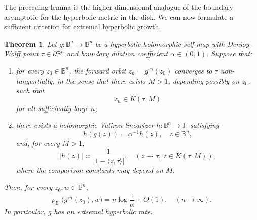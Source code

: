 \documentclass[12pt]{amsart}
\numberwithin{equation}{section}
\theoremstyle{plain}
\newtheorem{theorem}[equation]{Theorem}
\theoremstyle{definition}
\begin{document}
The preceding lemma is the higher-dimensional analogue of the boundary
asymptotic for the hyperbolic metric in the disk. We can now formulate a
sufficient criterion for extremal hyperbolic growth.

\begin{theorem}
\label{thm:ball}
Let
$g:\mathbb B^n\to\mathbb B^n$ be a hyperbolic holomorphic self-map with
Denjoy--Wolff point $\tau\in\partial\mathbb B^n$ and boundary dilation
coefficient $\alpha\in(0,1)$. Suppose that:

\begin{enumerate}
\item[\emph{(a)}]
for every $z_0\in\mathbb B^n$, the forward orbit
$z_n=g^{\circ n}(z_0)$ converges to $\tau$ non-tangentially, in the sense
that there exists $M>1$, depending possibly on $z_0$, such that
\begin{equation*}
z_n\in K(\tau,M)
\end{equation*}
for all sufficiently large $n$;

\item[\emph{(b)}]
there exists a holomorphic Valiron linearizer
$h:\mathbb B^n\to\mathbb H$ satisfying
\begin{equation}
\label{eq:ball_valiron}
h(g(z))
=
\alpha^{-1}h(z),
\quad z\in\mathbb B^n,
\end{equation}
and, for every $M>1$,
\begin{equation}
\label{eq:ball_nondegenerate}
|h(z)|
\asymp
\frac{1}{|1-\langle z,\tau\rangle|},
\quad
(z\to\tau,\ z\in K(\tau,M)),
\end{equation}
where the comparison constants may depend on $M$.
\end{enumerate}

Then, for every $z_0,w\in\mathbb B^n$,
\begin{equation*}
\label{eq:ball_extremal_rate}
\rho_{\mathbb B^n}
\bigl(g^{\circ n}(z_0),w\bigr)
=
n\log\frac1\alpha
+
O(1),
\quad
(n\to\infty).
\end{equation*}
In particular, $g$ has an extremal hyperbolic rate.
\end{theorem}
\end{document}
